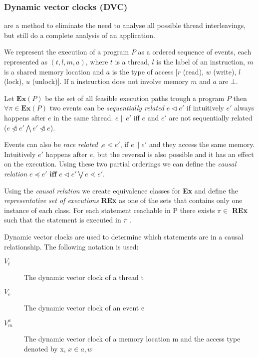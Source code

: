 \documentclass[10pt]{llncs}
\begin{document}
\subsubsection{Dynamic vector clocks (DVC)} are a method to eliminate the need to analyse all possible thread interleavings, but still do a complete analysis of an application.

We represent the execution of a program $P$ as a ordered sequence of events, each represented as $(t, l, m, a)$, where $t$ is a thread, $l$ is the label of an instruction, $m$ is a shared memory location and $a$ is the type of access [$r$ (read), $w$ (write), $l$ (lock), $u$ (unlock)]. If a instruction does not involve memory $m$ and $a$ are $\bot$.

Let $\textbf{Ex}(P)$ be the set of all feasible execution paths trough a program $P$ then $\forall \pi \in \textbf{Ex}(P)$ two events can be \emph{sequentially related} $e \triangleleft e'$ if intuitively $e'$ always happens after $e$ in the same thread. $e \parallel e'$ iff $e$ and $e'$ are not sequentially related ($e \ntriangleleft e' \bigwedge e' \ntriangleleft e$).

Events can also be \emph{race related} ,$e \lessdot e'$, if $e \parallel e'$ and they access the same memory. Intuitively $e'$ happens after $e$, but the reversal is also possible and it has an effect on the execution. Using these two partial orderings we can define the \emph{causal relation} $e \preceq e' \textbf{ iff } e \triangleleft e' \bigvee e \lessdot e'$.

Using the \emph{causal relation} we create equivalence classes for \textbf{Ex} and define the \emph{representative set of executions} \textbf{REx} as one of the sets that contains only one instance of each class. For each statement reachable in P there exists $\pi \in$ \textbf{REx} such that the statement is executed in $\pi$ \cite[§4]{base4}.

Dynamic vector clocks are used to determine which statements are in a causal relationship. The following notation is used:

\begin{description}
	\item[$V_t$] The dynamic vector clock of a thread t
	\item[$V_e$] The dynamic vector clock of an event e
	\item[$V_m^x$] The dynamic vector clock of a memory location m and the access type denoted by x, $x \in {a, w}$
\end{description}
\end{document}
